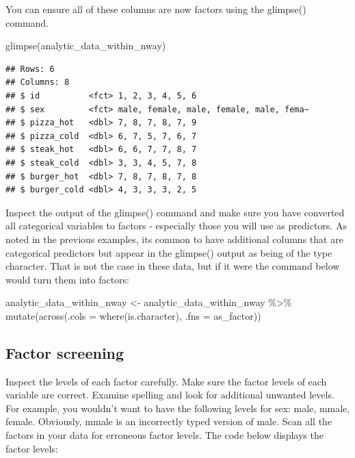 \documentclass[
]{krantz}
\makeatletter
\newenvironment{Shaded}{\begin{snugshade}}{\end{snugshade}}
\newcommand{\AttributeTok}[1]{\textcolor[rgb]{0.61,0.61,0.61}{#1}}
\newcommand{\FunctionTok}[1]{\textcolor[rgb]{0,0,0}{#1}}
\newcommand{\NormalTok}[1]{#1}
\newcommand{\OtherTok}[1]{\textcolor[rgb]{0.37,0.37,0.37}{#1}}
\newcommand{\SpecialCharTok}[1]{\textcolor[rgb]{0,0,0}{#1}}
\newenvironment{kframe}{%
\medskip{}
\setlength{\fboxsep}{.8em}
 \def\at@end@of@kframe{}%
 \ifinner\ifhmode%
  \def\at@end@of@kframe{\end{minipage}}%
  \begin{minipage}{\columnwidth}%
 \fi\fi%
 \def\FrameCommand##1{\hskip\@totalleftmargin \hskip-\fboxsep
 \colorbox{shadecolor}{##1}\hskip-\fboxsep
     \hskip-\linewidth \hskip-\@totalleftmargin \hskip\columnwidth}%
 \MakeFramed {\advance\hsize-\width
   \@totalleftmargin\z@ \linewidth\hsize
   \@setminipage}}%
 {\par\unskip\endMakeFramed%
 \at@end@of@kframe}
\renewenvironment{Shaded}{\begin{kframe}}{\end{kframe}}
\makeatother
\begin{document}
You can ensure all of these columns are now factors using the glimpse() command.

\begin{Shaded}
\begin{Highlighting}[]
\FunctionTok{glimpse}\NormalTok{(analytic\_data\_within\_nway)}
\end{Highlighting}
\end{Shaded}

\begin{verbatim}
## Rows: 6
## Columns: 8
## $ id          <fct> 1, 2, 3, 4, 5, 6
## $ sex         <fct> male, female, male, female, male, fema~
## $ pizza_hot   <dbl> 7, 8, 7, 8, 7, 9
## $ pizza_cold  <dbl> 6, 7, 5, 7, 6, 7
## $ steak_hot   <dbl> 6, 6, 7, 7, 8, 7
## $ steak_cold  <dbl> 3, 3, 4, 5, 7, 8
## $ burger_hot  <dbl> 7, 8, 7, 8, 7, 8
## $ burger_cold <dbl> 4, 3, 3, 3, 2, 5
\end{verbatim}

Inspect the output of the glimpse() command and make sure you have converted all categorical variables to factors - especially those you will use as predictors. As noted in the previous examples, its common to have additional columns that are categorical predictors but appear in the glimpse() output as being of the type character. That is not the case in these data, but if it were the command below would turn them into factors:

\begin{Shaded}
\begin{Highlighting}[]
\NormalTok{analytic\_data\_within\_nway }\OtherTok{\textless{}{-}}\NormalTok{ analytic\_data\_within\_nway }\SpecialCharTok{\%\textgreater{}\%}
  \FunctionTok{mutate}\NormalTok{(}\FunctionTok{across}\NormalTok{(}\AttributeTok{.cols =} \FunctionTok{where}\NormalTok{(is.character),}
                \AttributeTok{.fns =}\NormalTok{ as\_factor))}
\end{Highlighting}
\end{Shaded}

\hypertarget{factor-screening-2}{%
\subsection{Factor screening}\label{factor-screening-2}}

Inspect the levels of each factor carefully. Make sure the factor levels of each variable are correct. Examine spelling and look for additional unwanted levels. For example, you wouldn't want to have the following levels for sex: male, mmale, female. Obviously, mmale is an incorrectly typed version of male. Scan all the factors in your data for erroneous factor levels. The code below displays the factor levels:
\end{document}

